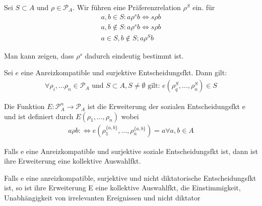\begin{defi}
	Sei $S \subset A$ und $\rho \in \mathcal{P}_A$. Wir führen eine Präferenzrelation $\rho^S$ ein. für 
	\begin{align*}
		a,b \in S: a \rho^s b \Leftrightarrow s \rho b \\
		a,b \notin S: a \rho^s b \Leftrightarrow s \rho b \\
		a \in S, b \notin S; a \rho^S b
	\end{align*}
\end{defi}
Man kann zeigen, dass $\rho^s$ dadurch eindeutig bestimmt ist. 

\begin{lem}
	Sei $e$ eine Anreizkompatible und surjektive Entscheidungsfkt. Dann gilt: 
	\begin{align*}
		\forall \rho_i, \dots \rho_n \in \mathcal{P}_A \text{ und } S \subset A, S \neq \emptyset \text{ gilt: } e(\rho_q^S, \dots, \rho_n^S) \in S
	\end{align*}
\end{lem}

\begin{defi}
	Die Funktion $E: \mathcal{P}_A^n \rightarrow \mathcal{P}_A$ ist die Erweiterung der sozialen Entscheidungsfkt e und ist definiert durch $E(\rho_1, \dots, \rho_n)$ wobei 
	\begin{align*}
		a \rho b : \Leftrightarrow e(\rho_1^{\{a,b\}} , \dots, \rho_n^{\{a,b\}})=a \forall a,b \in A
	\end{align*}
\end{defi}

\begin{lem}
	Falls e eine Anreizkompatible und surjektive soziale Entscheidungsfkt ist, dann ist ihre Erweiterung eine kollektive Auswahlfkt. 
\end{lem}

\begin{lem}[Erweiterungslemma]
	Falls e eine anreizkompatible, surjektive und nicht diktatorische Entscheidungsfkt ist, so ist ihre Erweiterung E eine kollektive Auswahlfkt, die Einstimmigkeit, Unabhängigkeit von irrelevanten Ereignissen und nicht diktator
\end{lem}







